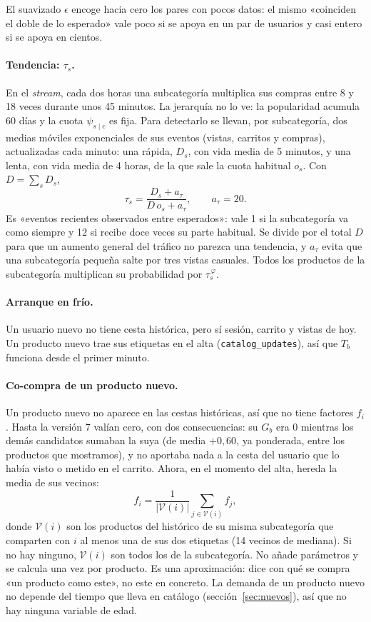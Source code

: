 \documentclass[11pt,a4paper]{article}
\newcommand{\cod}[1]{\texttt{#1}}
\begin{document}
El suavizado $\epsilon$ encoge hacia cero los pares con pocos datos: el mismo «coinciden el doble de lo
esperado» vale poco si se apoya en un par de usuarios y casi entero si se apoya en cientos.

\paragraph{Tendencia: $\tau_s$.} En el \emph{stream}, cada dos horas una subcategoría multiplica sus
compras entre 8 y 18 veces durante unos 45 minutos. La jerarquía no lo ve: la popularidad acumula 60 días
y la cuota $\psi_{s\mid c}$ es fija. Para detectarlo se llevan, por subcategoría, dos medias móviles
exponenciales de sus eventos (vistas, carritos y compras), actualizadas cada minuto: una rápida, $D_s$,
con vida media de 5 minutos, y una lenta, con vida media de 4 horas, de la que sale la cuota habitual
$o_s$. Con $D=\sum_s D_s$,
\[
\tau_s=\frac{D_s+a_\tau}{D\,o_s+a_\tau},\qquad a_\tau=20 .
\]
Es «eventos recientes observados entre esperados»: vale 1 si la subcategoría va como siempre y 12 si
recibe doce veces su parte habitual. Se divide por el total $D$ para que un aumento general del tráfico
no parezca una tendencia, y $a_\tau$ evita que una subcategoría pequeña salte por tres vistas casuales.
Todos los productos de la subcategoría multiplican su probabilidad por $\tau_s^{\,\varphi}$.

\paragraph{Arranque en frío.} Un usuario nuevo no tiene cesta histórica, pero sí sesión, carrito y vistas
de hoy. Un producto nuevo trae sus etiquetas en el alta (\cod{catalog\_updates}), así que $T_b$ funciona
desde el primer minuto.

\paragraph{Co-compra de un producto nuevo.} Un producto nuevo no aparece en las cestas históricas, así
que no tiene factores $f_i$. Hasta la versión 7 valían cero, con dos consecuencias: su $G_b$ era 0
mientras los demás candidatos sumaban la suya (de media $+0{,}60$, ya ponderada, entre los productos que
mostramos), y no aportaba nada a la cesta del usuario que lo había visto o metido en el carrito. Ahora,
en el momento del alta, hereda la media de sus vecinos:
\[
f_i=\frac{1}{|\mathcal V(i)|}\sum_{j\in\mathcal V(i)} f_j ,
\]
donde $\mathcal V(i)$ son los productos del histórico de su misma subcategoría que comparten con $i$ al
menos una de sus dos etiquetas (14 vecinos de mediana). Si no hay ninguno, $\mathcal V(i)$ son todos los
de la subcategoría. No añade parámetros y se calcula una vez por producto. Es una aproximación: dice con
qué se compra «un producto como este», no este en concreto. La demanda de un producto nuevo no depende
del tiempo que lleva en catálogo (sección~\ref{sec:nuevos}), así que no hay ninguna variable de edad.
\end{document}

